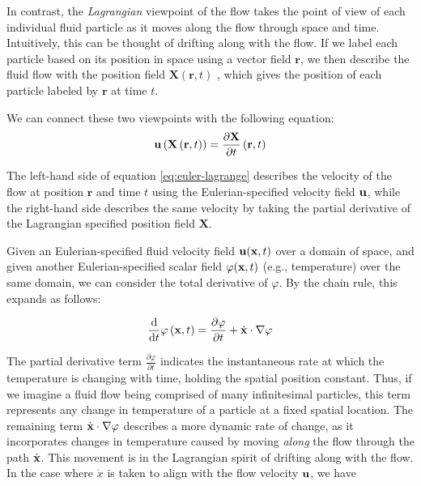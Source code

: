 In contrast, the {\em Lagrangian} viewpoint of the flow takes the point of view of each individual fluid particle as it moves along the flow through space and time. Intuitively, this can be thought of drifting along with the flow. If we label each particle based on its position in space using a vector field $\mathbf{r}$, we then describe the fluid flow with the position field $\mathbf{X}(\mathbf{r}, t)$ , which gives the position of each particle labeled by $\mathbf{r}$ at time $t$.

We can connect these two viewpoints with the following equation:
\begin{equation}
\label{eq:euler-lagrange}
\mathbf{u}\left(\mathbf{X}\left(\mathbf{r}, t\right)\right) = \frac{\partial \mathbf{X}}{\partial t}\left(\mathbf{r}, t\right)
\end{equation}

The left-hand side of equation \ref{eq:euler-lagrange} describes the velocity of the flow at position $\mathbf{r}$ and time $t$ using the Eulerian-specified velocity field $\mathbf{u}$, while the right-hand side describes the same velocity by taking the partial derivative of the Lagrangian specified position field $\mathbf{X}$.

Given an Eulerian-specified fluid velocity field $\mathbf{u}(\mathbf{x}, t)$ over a domain of space, and given another Eulerian-specified scalar field $\varphi(\mathbf{x}, t)$ (e.g., temperature) over the same domain, we can consider the total derivative of $\varphi$. By the chain rule, this expands as follows:

\begin{equation}
\frac{\mathrm{d}}{\mathrm{d}t}\varphi\left(\mathbf{x}, t\right) = \frac{\partial \varphi}{\partial t} + \dot{\mathbf{x}} \cdot \nabla \varphi
\end{equation}

The partial derivative term $\frac{\partial \varphi}{\partial t}$ indicates the instantaneous rate at which the temperature is changing with time, holding the spatial position constant. Thus, if we imagine a fluid flow being comprised of many infinitesimal particles, this term represents any change in temperature of a particle at a fixed spatial location. The remaining term $\dot{\mathbf{x}} \cdot \nabla \varphi$ describes a more dynamic rate of change, as it incorporates changes in temperature caused by moving {\em along} the flow through the path $\dot{\mathbf{x}}$. This movement is in the Lagrangian spirit of drifting along with the flow. In the case where $\dot{x}$ is taken to align with the flow velocity $\mathbf{u}$, we have 

